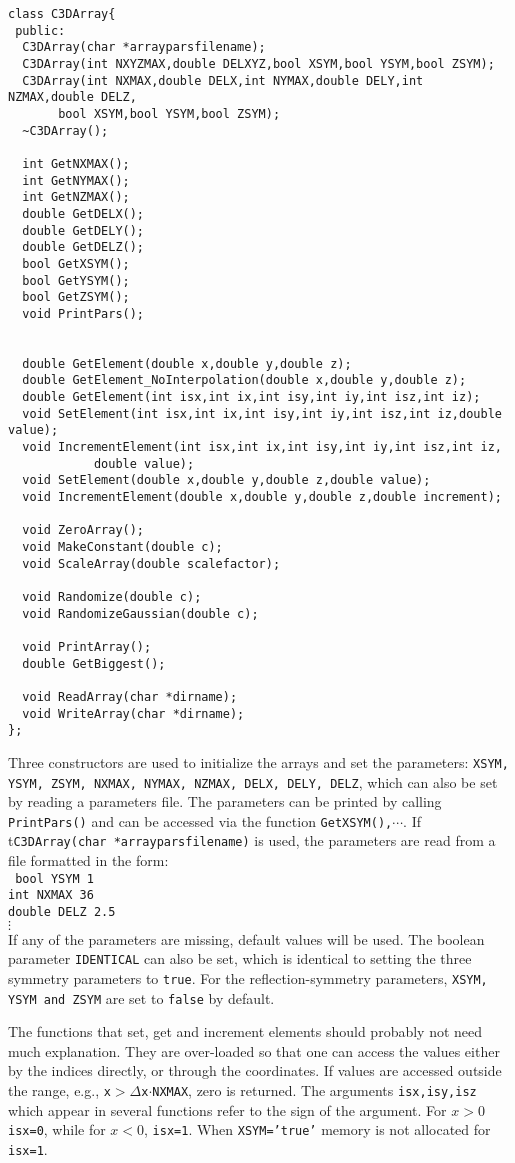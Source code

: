 \documentclass[10pt]{article}
\begin{document}
\begin{verbatim}
class C3DArray{
 public:
  C3DArray(char *arrayparsfilename);
  C3DArray(int NXYZMAX,double DELXYZ,bool XSYM,bool YSYM,bool ZSYM);
  C3DArray(int NXMAX,double DELX,int NYMAX,double DELY,int NZMAX,double DELZ,
	   bool XSYM,bool YSYM,bool ZSYM);
  ~C3DArray();

  int GetNXMAX();
  int GetNYMAX();
  int GetNZMAX();
  double GetDELX();
  double GetDELY();
  double GetDELZ();
  bool GetXSYM();
  bool GetYSYM();
  bool GetZSYM();
  void PrintPars();


  double GetElement(double x,double y,double z);
  double GetElement_NoInterpolation(double x,double y,double z);
  double GetElement(int isx,int ix,int isy,int iy,int isz,int iz);
  void SetElement(int isx,int ix,int isy,int iy,int isz,int iz,double value);
  void IncrementElement(int isx,int ix,int isy,int iy,int isz,int iz,
			double value);
  void SetElement(double x,double y,double z,double value);
  void IncrementElement(double x,double y,double z,double increment);

  void ZeroArray();
  void MakeConstant(double c);
  void ScaleArray(double scalefactor);

  void Randomize(double c);
  void RandomizeGaussian(double c);

  void PrintArray();
  double GetBiggest();

  void ReadArray(char *dirname);
  void WriteArray(char *dirname);
};
\end{verbatim}
Three constructors are used to initialize the arrays and set the parameters: {\tt XSYM, YSYM, ZSYM, NXMAX, NYMAX, NZMAX, DELX, DELY, DELZ}, which can also be set by reading a parameters file. The parameters can be printed by calling {\tt PrintPars()} and can be accessed via the function {\tt GetXSYM(),$\cdots$}. If t{\tt C3DArray(char *arrayparsfilename)} is used, the parameters are read from a file formatted in the form:\\
{\tt
bool YSYM 1\\
int NXMAX 36\\
double DELZ 2.5\\
$\vdots$\\
}
If any of the parameters are missing, default values will be used. The boolean parameter {\tt IDENTICAL} can also be set, which is identical to setting the three symmetry parameters to {\tt true}. For the reflection-symmetry parameters, {\tt XSYM, YSYM and ZSYM} are set to {\tt false} by default.

The functions that set, get and increment elements should probably not need much explanation. They are over-loaded so that one can access the values either by the indices directly, or through the coordinates. If values are accessed outside the range, e.g., {\tt x$>\Delta$x$\cdot$NXMAX}, zero is returned. The arguments {\tt isx,isy,isz} which appear in several functions refer to the sign of the argument. For $x>0$ {\tt isx=0}, while for $x<0$, {\tt isx=1}. When {\tt XSYM='true'} memory is not allocated for {\tt isx=1}.
\end{document}
